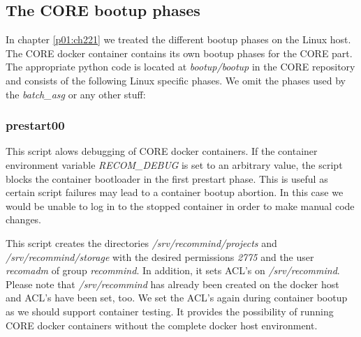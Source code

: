 		\subsection{The CORE bootup phases}\label{p01:ch0322}
		In chapter \ref{p01:ch221} we treated the different bootup phases on the Linux host. The CORE docker container contains its own bootup phases for the CORE part. The appropriate python code is located at \emph{bootup/bootup} in the CORE repository and consists of the following Linux specific phases. We omit the phases used by the \emph{batch\_asg} or any other stuff:
			
			\subsubsection{prestart00}
			\begin{description}\sloppy
				\item[check debug environment] This script alows debugging of CORE docker containers. If the container environment variable \emph{RECOM\_DEBUG} is set to an arbitrary value, the script blocks the container bootloader in the first prestart phase. This is useful as certain script failures may lead to a container bootup abortion. In this case we would be unable to log in to the stopped container in order to make manual code changes.
				\item[setup directories] This script creates the directories \emph{/srv/recommind/projects} and \emph{/srv/recommind/storage} with the desired permissions \emph{2775} and the user \emph{recomadm} of group \emph{recommind}. In addition, it sets ACL's on \emph{/srv/recommind}. Please note that \emph{/srv/recommind} has already been created on the docker host and ACL's have been set, too. We set the ACL's again during container bootup as we should support container testing. It provides the possibility of running CORE docker containers without the complete docker host environment.
			\end{description}
